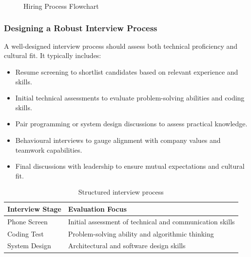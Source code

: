 \begin{figure}[h]
    \centering
    \caption{Hiring Process Flowchart}
    \label{fig:hiring_flowchart}
\end{figure}

\subsubsection{Designing a Robust Interview Process}

A well-designed interview process should assess both technical proficiency and cultural fit. It typically includes:

\begin{itemize}
    \item Resume screening to shortlist candidates based on relevant experience and skills.
    \item Initial technical assessments to evaluate problem-solving abilities and coding skills.
    \item Pair programming or system design discussions to assess practical knowledge.
    \item Behavioural interviews to gauge alignment with company values and teamwork capabilities.
    \item Final discussions with leadership to ensure mutual expectations and cultural fit.
\end{itemize}

\begin{table}[h]
    \centering
    \begin{tabular}{|l|l|}
        \hline
        \textbf{Interview Stage} & \textbf{Evaluation Focus}                                \\
        \hline
        Phone Screen             & Initial assessment of technical and communication skills \\
        \hline
        Coding Test              & Problem-solving ability and algorithmic thinking         \\
        \hline
        System Design            & Architectural and software design skills                 \\
        \hline
    \end{tabular}
    \caption{Structured interview process}
    \label{tab:interviewprocess}
\end{table}

